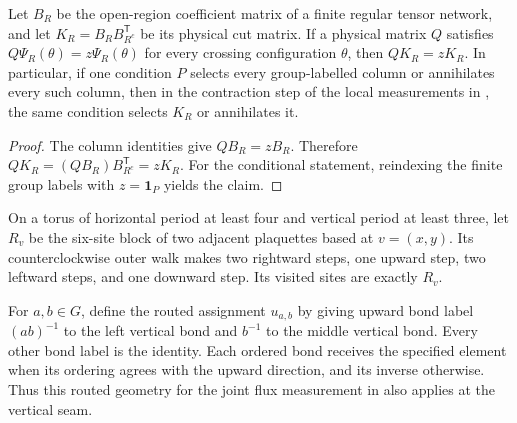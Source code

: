 \begin{lemma}%
    \label{thm:peps_physical_cut_column_action}
    \leanok
    Let $B_R$ be the open-region coefficient matrix of a finite regular
    tensor network, and let $K_R=B_R B_{R^c}^{\mathsf T}$ be its physical cut
    matrix. If a physical matrix $Q$ satisfies
    $Q\Psi_R(\theta)=z\Psi_R(\theta)$ for every crossing configuration $\theta$,
    then $QK_R=zK_R$. In particular, if one condition $P$ selects every
    group-labelled column or annihilates every such column, then in the
    contraction step of the local measurements in
    \cite[Theorem~6.15]{Schuch2010PEPS}, the same condition selects $K_R$
    or annihilates it.
\end{lemma}

\begin{proof}\leanok
    The column identities give $QB_R=zB_R$. Therefore
    $QK_R=(QB_R)B_{R^c}^{\mathsf T}=zK_R$.
    For the conditional statement, reindexing the finite group labels with
    $z=\mathbf1_P$ yields the claim.
\end{proof}

\begin{definition}%
    \label{def:peps_torus_joint_flux_geometry}
    \leanok
    On a torus of horizontal period at least four and vertical period at least
    three, let $R_v$ be the six-site block of two adjacent plaquettes based at
    $v=(x,y)$. Its counterclockwise outer walk makes two rightward steps, one
    upward step, two leftward steps, and one downward step. Its visited sites
    are exactly $R_v$.

    For $a,b\in G$, define the routed assignment $u_{a,b}$ by giving upward
    bond label $(ab)^{-1}$ to the left vertical bond and $b^{-1}$ to the middle
    vertical bond. Every other bond label is the identity. Each ordered bond
    receives the specified element when its ordering agrees with the upward
    direction, and its inverse otherwise. Thus this routed geometry for the joint flux measurement in
    \cite[braiding passage]{Schuch2010PEPS} also applies at the vertical seam.
\end{definition}

